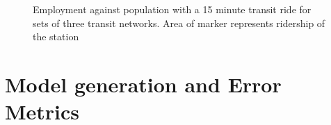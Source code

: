 \documentclass[11pt]{article}
\begin{document}
\begin{figure}
\centering
{}

\vspace{-15pt}
\captionsetup{singlelinecheck=off, justification=centering}
\caption[]{Employment against population with a 15 minute transit ride for sets of three transit networks.\linebreak
Area of marker represents ridership of the station}\label{fig:networkvars}
\end{figure}




\section{Model generation and Error Metrics}
\end{document}

